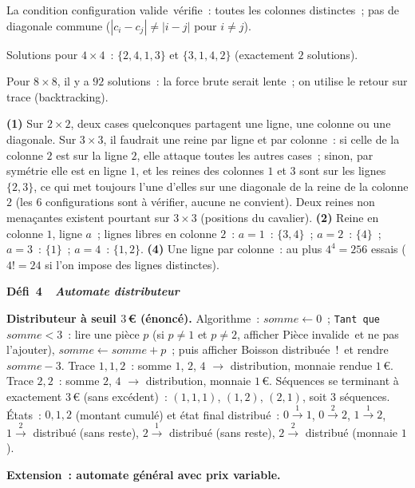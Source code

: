 La condition \og configuration valide\fg\ v\'erifie~:
toutes les colonnes distinctes~; pas de diagonale commune
($|c_i-c_j|\ne|i-j|$ pour $i\ne j$).

Solutions pour $4\times4$~: $\{2,4,1,3\}$ et $\{3,1,4,2\}$ (exactement $2$ solutions).

Pour $8\times8$, il y a $92$ solutions~: la force brute serait lente~;
on utilise le retour sur trace (backtracking).

\textbf{(1)} Sur $2\times2$, deux cases quelconques partagent une ligne, une colonne ou une diagonale. Sur $3\times3$, il faudrait une reine par ligne et par colonne~: si celle de la colonne $2$ est sur la ligne $2$, elle attaque toutes les autres cases~; sinon, par sym\'etrie elle est en ligne $1$, et les reines des colonnes $1$ et $3$ sont sur les lignes $\{2,3\}$, ce qui met toujours l'une d'elles sur une diagonale de la reine de la colonne $2$ (les $6$ configurations sont \`a v\'erifier, aucune ne convient). Deux reines non menaçantes existent pourtant sur $3\times3$ (positions du cavalier).
\textbf{(2)} Reine en colonne $1$, ligne $a$~; lignes libres en colonne $2$~: $a=1$~: $\{3,4\}$~; $a=2$~: $\{4\}$~; $a=3$~: $\{1\}$~; $a=4$~: $\{1,2\}$.
\textbf{(4)} Une ligne par colonne~: au plus $4^4=256$ essais ($4!=24$ si l'on impose des lignes distinctes).

\noindent{}
{\color{BO}\bfseries\small D\'efi~4~\textendash\ \textit{Automate distributeur}}
\par\smallskip

\textbf{Distributeur \`a seuil $3$\,\euro{} (\'enonc\'e).} Algorithme~: $\mathit{somme}\leftarrow0$~; \texttt{Tant que} $\mathit{somme}<3$~: lire une pi\`ece $p$ (si $p\ne1$ et $p\ne2$, afficher \og Pi\`ece invalide\fg\ et ne pas l'ajouter), $\mathit{somme}\leftarrow\mathit{somme}+p$~; puis afficher \og Boisson distribu\'ee~!\fg\ et rendre $\mathit{somme}-3$.
Trace $1,1,2$~: somme $1$, $2$, $4$ $\to$ distribution, monnaie rendue $1$\,\euro. Trace $2,2$~: somme $2$, $4$ $\to$ distribution, monnaie $1$\,\euro.
S\'equences se terminant \`a exactement $3$\,\euro{} (sans exc\'edent)~: $(1,1,1)$, $(1,2)$, $(2,1)$, soit $3$ s\'equences.
\'Etats~: $0,1,2$ (montant cumul\'e) et \'etat final \og distribu\'e\fg~: $0\xrightarrow{1}1$, $0\xrightarrow{2}2$, $1\xrightarrow{1}2$, $1\xrightarrow{2}$ distribu\'e (sans reste), $2\xrightarrow{1}$ distribu\'e (sans reste), $2\xrightarrow{2}$ distribu\'e (monnaie $1$).

\textbf{Extension~: automate g\'en\'eral avec prix variable.}

